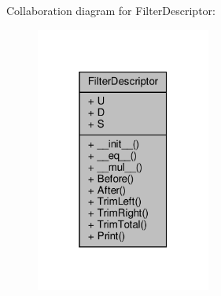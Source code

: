 Collaboration diagram for Filter\+Descriptor\+:\nopagebreak
\begin{figure}[H]
\begin{center}
\leavevmode
\includegraphics[width=163pt]{classSignalIntegrity_1_1TimeDomain_1_1Filters_1_1FilterDescriptor_1_1FilterDescriptor__coll__graph}
\end{center}
\end{figure}
